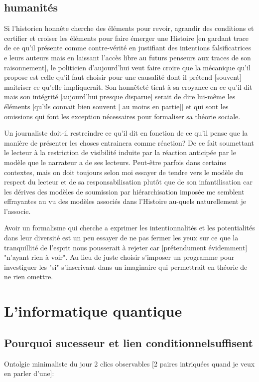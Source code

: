\documentclass{article}
\begin{document}
  
 \subsection{humanités}
 Si l'historien honnête cherche des éléments pour revoir, agrandir des conditions et certifier et croiser les éléments pour faire émerger une Histoire [en gardant trace de ce qu'il présente comme contre-vérité en justifiant des intentions falsificatrices e leurs auteurs mais en laissant l'accès libre au futurs penseurs aux traces de son raisonnement], le politicien d'aujourd'hui veut faire croire que la mécanique qu'il propose est celle qu'il faut choisir pour une causalité dont il prétend [souvent] maitriser  ce qu'elle impliquerait. Son honnêteté tient à sa croyance en ce qu'il dit mais  son intégrité [aujourd'hui presque disparue] serait de dire lui-même les éléments [qu'ils connait bien souvent [ au moins en partie]] et qui sont les omissions qui font les exception nécessaires pour formaliser sa théorie sociale.
 
 Un journaliste doit-il restreindre ce qu'il dit en fonction de ce qu'il pense que la manière de présenter les choses entrainera comme réaction?  De ce fait soumettant le lecteur à la restriction de visibilité induite par la réaction anticipée par  le modèle que le narrateur a de ses lecteurs. 
 Peut-être parfois dans certains contextes, mais on doit toujours selon moi essayer de tendre vers le modèle du respect du lecteur et de sa responsabilisation plutôt que de son infantilisation car les dérives des modèles de soumission par  hiérarchisation imposée me semblent effrayantes au vu des modèles associés dans l'Histoire au-quels naturellement je l'associe.
 
 
 Avoir un formalisme qui cherche a exprimer les intentionnalités et les potentialités dans leur diversité est un peu essayer de ne pas fermer les yeux 
 sur ce que la tranquillité de l'esprit nous pousserait à rejeter car [prétendument évidemment]  "n'ayant rien à voir".
 Au lieu de juste choisir s'imposer un programme pour investiguer les "si" s'inscrivant dans un imaginaire qui permettrait en théorie de ne rien omettre.
 
\section{L'informatique quantique}
\subsection{Pourquoi sucesseur et lien conditionnelsuffisent}
Ontolgie minimaliste du jour 2 clics observables [2 paires intriquées quand je veux en parler d'une]:
\end{document}
